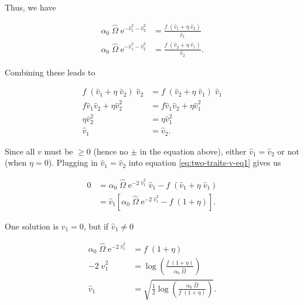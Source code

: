 \noindent Thus, we have

\begin{equation*}
\begin{split}
    \alpha_0 \; \hat{\Omega} \; \textrm{e}^{-\hat{v}_{1}^2 - \hat{v}_{2}^2} &=
        \frac{ f \; ( \hat{v}_{1} + \eta \; \hat{v}_{2} ) }{ \hat{v}_{1} } \\
    \alpha_0 \; \hat{\Omega} \; \textrm{e}^{-\hat{v}_{1}^2 - \hat{v}_{2}^2} &=
        \frac{ f \; ( \hat{v}_{2} + \eta \; \hat{v}_{1} ) }{ \hat{v}_{2} }
    \textrm{.}
\end{split}
\end{equation*}


\noindent Combining these leads to

\begin{equation*}
\begin{split}
    f \; ( \hat{v}_{1} + \eta \; \hat{v}_{2} ) \; \hat{v}_{2} &=
        f \; ( \hat{v}_{2} + \eta \; \hat{v}_{1} ) \; \hat{v}_{1} \\
    f \hat{v}_{1} \hat{v}_{2} + \eta \hat{v}_{2}^2 &=
        f \hat{v}_{1} \hat{v}_{2} + \eta \hat{v}_{1}^2 \\
    \eta \hat{v}_{2}^2 &= \eta \hat{v}_{1}^2 \\
    \hat{v}_{1} &= \hat{v}_{2}
    \textrm{.}
\end{split}
\end{equation*}

Since all $v$ must be $\ge 0$ (hence no $\pm$ in the equation above),
either $\hat{v}_{1} = \hat{v}_{2}$ or not (when $\eta = 0$).
Plugging in $\hat{v}_{1} = \hat{v}_{2}$ into equation \ref{eq:two-traits-v-eq1}
gives us

\begin{equation*}
\begin{split}
    0 &= \alpha_0 \; \hat{\Omega} \; \textrm{e}^{-2 \; \hat{v}_{1}^2 } \; \hat{v}_{1}
        - f \; ( \hat{v}_{1} + \eta \; \hat{v}_{1} ) \\
    &= \hat{v}_{1} \left[ \alpha_0 \; \hat{\Omega} \; \textrm{e}^{-2 \; \hat{v}_{1}^2 }
        - f \; ( 1 + \eta ) \right]
    \textrm{.}
\end{split}
\end{equation*}

\noindent One solution is $\hat{v}_{1} = 0$, but if $\hat{v}_{1} \ne 0$


\begin{equation}
\begin{split}
    \alpha_0 \; \hat{\Omega} \; \textrm{e}^{-2 \; \hat{v}_{1}^2 } &=
        f \; ( 1 + \eta ) \\
    -2 \; \hat{v}_{1}^2 &=
        \log \left( \frac{ f \; ( 1 + \eta ) }{ \alpha_0 \; \hat{\Omega} } \right) \\
    \hat{v}_{1} &= \sqrt{\frac{1}{2}
        \log \left( \frac{ \alpha_0 \; \hat{\Omega} }{ f \; ( 1 + \eta ) } \right) }
    \textrm{.}
\end{split}
\label{eq:two-traits-v-eq5}
\end{equation}



